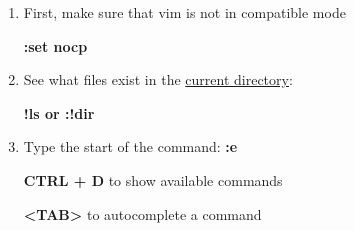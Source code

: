 \documentclass[12pt, letterpaper]{article}
\begin{document}
\begin{flushleft}
\begin{enumerate}
    \item First, make sure that vim is not in compatible mode \par \textbf{:set nocp} \\ \par
    \item See what files exist in the \underline{current directory}: \par \textbf{!ls or :!dir} \\ \par
    \item Type the start of the command: \textbf{:e} \\ \par \textbf{CTRL + D} \rightarrow to \hspace{1ex} show \hspace{1ex}  available \hspace{1ex}  commands \\ \par \textbf{<TAB>} \rightarrow to \hspace{1ex}  autocomplete \hspace{1ex}  a \hspace{1ex}  command \\ \par
\end{enumerate}




 























\end{flushleft}
\end{document}
